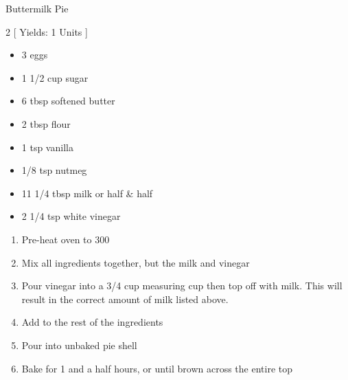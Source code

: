 \begin{Large}
    Buttermilk Pie
\end{Large}

\begin{scriptsize}
\begin{multicols}{2}
[
\vspace{1em}
Yields: 1 Units
\vspace{-1.5em}
]

\begin{itemize}
    \item 3 eggs
    \item 1 1/2 cup sugar
    \item 6 tbsp softened butter
    \item 2 tbsp flour
    \item 1 tsp vanilla
    \item 1/8 tsp nutmeg
    \item 11 1/4 tbsp milk or half \& half
    \item 2 1/4 tsp white vinegar
\end{itemize}
\end{multicols}
\end{scriptsize}

\begin{footnotesize}
\begin{enumerate}
    \item Pre-heat oven to 300\degree
    \item Mix all ingredients together, but the milk and vinegar
    \item Pour vinegar into a 3/4 cup measuring cup then top off with milk. This will result in the correct amount of milk listed above.
    \item Add to the rest of the ingredients
    \item Pour into unbaked pie shell
    \item Bake for 1 and a half hours, or until brown across the entire top
\end{enumerate}
\end{footnotesize}

\vspace{2em}
